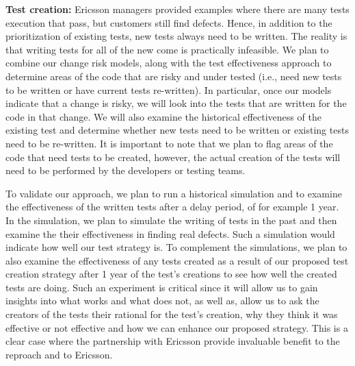 \textbf{Test creation:} Ericsson managers provided examples where there are many tests execution that pass, but customers still find defects. Hence, in addition to the prioritization of existing tests, new tests always need to be written. The reality is that writing tests for all of the new come is practically infeasible. We plan to combine our change risk models, along with the test effectiveness approach to determine areas of the code that are risky and under tested (i.e., need new tests to be written or have current tests re-written). In particular, once our models indicate that a change is risky, we will look into the tests that are written for the code in that change. We will also examine the historical effectiveness of the existing test and determine whether new tests need to be written or existing tests need to be re-written. It is important to note that we plan to flag areas of the code that need tests to be created, however, the actual creation of the tests will need to be performed by the developers or testing teams.

To validate our approach, we plan to run a historical simulation and to examine the effectiveness of the written tests after a delay period, of for example 1 year. In the simulation, we plan to simulate the writing of tests in the past and then examine the their effectiveness in finding real defects. Such a simulation would indicate how well our test strategy is. To complement the simulations, we plan to also examine the effectiveness of any tests created as a result of our proposed test creation strategy after 1 year of the test's creations to see how well the created tests are doing. Such an experiment is critical since it will allow us to gain insights into what works and what does not, as well as, allow us to ask the creators of the tests their rational for the test's creation, why they think it was effective or not effective and how we can enhance our proposed strategy. This is a clear case where the partnership with Ericsson provide invaluable benefit to the reproach and to Ericsson.



